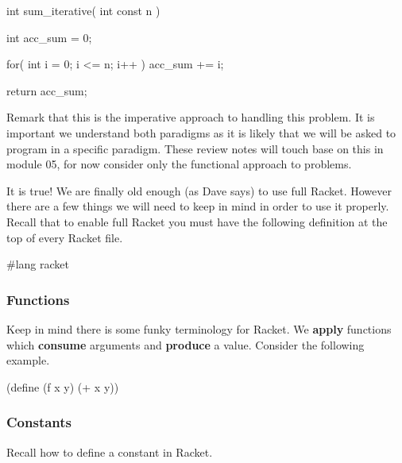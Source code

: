 \clearpage
\begin{code}[c]
int sum_iterative( int const n ) {
	int acc_sum = 0;
	
	for( int i = 0; i <= n; i++ ) {
		acc_sum += i;
	}
	
	return acc_sum;
}
\end{code}

Remark that this is the imperative approach to handling this problem. It is important we understand both paradigms as it is likely that we will be asked to program in a specific paradigm. These review notes will touch base on this in module 05, for now consider only the functional approach to problems.



It is true! We are finally old enough (as Dave says) to use full Racket. However there are a few things we will need to keep in mind in order to use it properly. Recall that to enable full Racket you must have the following definition at the top of every Racket file.\\

\begin{code}[Lisp]
#lang racket
\end{code}

\subsubsection*{Functions}

Keep in mind there is some funky terminology for Racket. We \textbf{apply} functions which \textbf{consume} arguments and \textbf{produce} a value. Consider the following example.\\


\begin{code}[Lisp]
(define (f x y)
	(+ x y))
\end{code}

\subsubsection*{Constants}

Recall how to define a constant in Racket.\\

